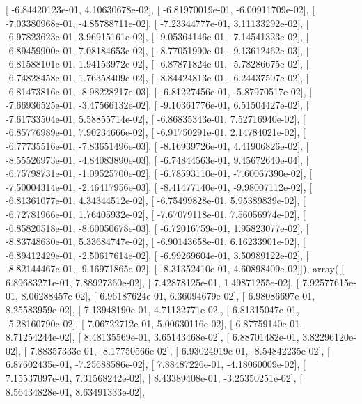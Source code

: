 \documentclass{article}
\begin{document}
       [ -6.84420123e-01,   4.10630678e-02],
       [ -6.81970019e-01,  -6.00911709e-02],
       [ -7.03380968e-01,  -4.85788711e-02],
       [ -7.23344777e-01,   3.11133292e-02],
       [ -6.97823623e-01,   3.96915161e-02],
       [ -9.05364146e-01,  -7.14541323e-02],
       [ -6.89459900e-01,   7.08184653e-02],
       [ -8.77051990e-01,  -9.13612462e-03],
       [ -6.81588101e-01,   1.94153972e-02],
       [ -6.87871824e-01,  -5.78286675e-02],
       [ -6.74828458e-01,   1.76358409e-02],
       [ -8.84424813e-01,  -6.24437507e-02],
       [ -6.81473816e-01,  -8.98228217e-03],
       [ -6.81227456e-01,  -5.87970517e-02],
       [ -7.66936525e-01,  -3.47566132e-02],
       [ -9.10361776e-01,   6.51504427e-02],
       [ -7.61733504e-01,   5.58855714e-02],
       [ -6.86835343e-01,   7.52716940e-02],
       [ -6.85776989e-01,   7.90234666e-02],
       [ -6.91750291e-01,   2.14784021e-02],
       [ -6.77735516e-01,  -7.83651496e-03],
       [ -8.16939726e-01,   4.41906826e-02],
       [ -8.55526973e-01,  -4.84083890e-03],
       [ -6.74844563e-01,   9.45672640e-04],
       [ -6.75798731e-01,  -1.09525700e-02],
       [ -6.78593110e-01,  -7.60067390e-02],
       [ -7.50004314e-01,  -2.46417956e-03],
       [ -8.41477140e-01,  -9.98007112e-02],
       [ -6.81361077e-01,   4.34344512e-02],
       [ -6.75499828e-01,   5.95389839e-02],
       [ -6.72781966e-01,   1.76405932e-02],
       [ -7.67079118e-01,   7.56056974e-02],
       [ -6.85820518e-01,  -8.60050678e-03],
       [ -6.72016759e-01,   1.95823077e-02],
       [ -8.83748630e-01,   5.33684747e-02],
       [ -6.90143658e-01,   6.16233901e-02],
       [ -6.89412429e-01,  -2.50617614e-02],
       [ -6.99269604e-01,   3.50989122e-02],
       [ -8.82144467e-01,  -9.16971865e-02],
       [ -8.31352410e-01,   4.60898409e-02]]), array([[  6.89683271e-01,   7.88927360e-02],
       [  7.42878125e-01,   1.49871255e-02],
       [  7.92577615e-01,   8.06288457e-02],
       [  6.96187624e-01,   6.36094679e-02],
       [  6.98086697e-01,   8.25583959e-02],
       [  7.13948190e-01,   4.71132771e-02],
       [  6.81315047e-01,  -5.28160790e-02],
       [  7.06722712e-01,   5.00630116e-02],
       [  6.87759140e-01,   8.71254244e-02],
       [  8.48135569e-01,   3.65143468e-02],
       [  6.88701482e-01,   3.82296120e-02],
       [  7.88357333e-01,  -8.17750566e-02],
       [  6.93024919e-01,  -8.54842235e-02],
       [  6.87602435e-01,  -7.25688586e-02],
       [  7.88487226e-01,  -4.18060009e-02],
       [  7.15537097e-01,   7.31568242e-02],
       [  8.43389408e-01,  -3.25350251e-02],
       [  8.56434828e-01,   8.63491333e-02],
\end{document}
